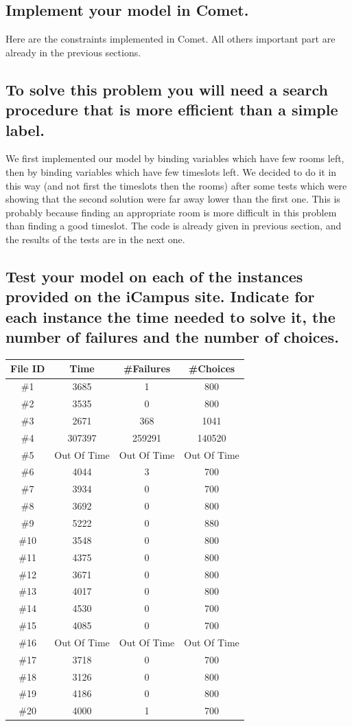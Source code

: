 \documentclass[a4paper ,12pt,french]{article}
\begin{document}
\subsection{Implement your model in Comet.}

Here are the constraints implemented in Comet. All others important part are already in the previous sections.




\subsection{To solve this problem you will need a search procedure that is more efficient than a simple label.}

We first implemented our model by binding variables which have few rooms left, then by binding variables which have few timeslots left. We decided to do it in this way (and not first the timeslots then the rooms) after some tests which were showing that the second solution were far away lower than the first one. This is probably because finding an appropriate room is more difficult in this problem than finding a good timeslot. The code is already given in previous section, and the results of the tests are in the next one.

\subsection{Test your model on each of the instances provided on the iCampus site. Indicate for each instance the time needed to solve it, the number of failures and the number of choices.}

\begin{tabular}{|c|c|c|c|}
\hline
File ID& Time & \#Failures & \#Choices\\
\hline
\hline
\#1&3685&1&800\\
\hline
\#2&3535&0&800\\
\hline
\#3&2671&368&1041\\
\hline
\#4&307397&259291&140520\\
\hline
\#5&Out Of Time&Out Of Time&Out Of Time\\
\hline
\#6&4044&3&700\\
\hline
\#7&3934&0&700\\
\hline
\#8&3692&0&800\\
\hline
\#9&5222&0&880\\
\hline
\#10&3548&0&800\\
\hline
\#11&4375&0&800\\
\hline
\#12&3671&0&800\\
\hline
\#13&4017&0&800\\
\hline
\#14&4530&0&700\\
\hline
\#15&4085&0&700\\
\hline
\#16&Out Of Time&Out Of Time&Out Of Time\\
\hline
\#17&3718&0&700\\
\hline
\#18&3126&0&800\\
\hline
\#19&4186&0&800\\
\hline
\#20&4000&1&700\\
\hline
\end{tabular}
\end{document}

